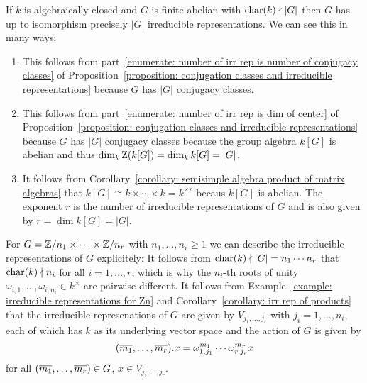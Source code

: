 \begin{example}
  \label{example: irrep of finite abelian groups}
  If $k$ is algebraically closed and $G$ is finite abelian with $\operatorname{char}(k) \nmid |G|$ then $G$ has up to isomorphism precisely $|G|$ irreducible representations.
  We can see this in many ways:
  \begin{enumerate}
    \item
      This follows from part~\ref*{enumerate: number of irr rep is number of conjugacy classes} of Proposition~\ref*{proposition: conjugation classes and irreducible representations} because $G$ has $|G|$ conjugacy classes.
    \item
      This follows from part~\ref*{enumerate: number of irr rep is dim of center} of Proposition~\ref*{proposition: conjugation classes and irreducible representations} because $G$ has $|G|$ conjugacy classes because the group algebra $k[G]$ is abelian and thus $\dim_k \operatorname{Z}(k[G]) = \dim_k k[G] = |G|$.
    \item
      It follows from Corollary~\ref{corollary: semisimple algebra product of matrix algebras} that $k[G] \cong k \times \dotsb \times k = k^{\times r}$ becaus $k[G]$ is abelian.
      The exponent $r$ is the number of irreducible representations of $G$ and is also given by $r = \dim k[G] = |G|$.
  \end{enumerate}
  For $G = \mathbb{Z}/n_1 \times \dotsb \times \mathbb{Z}/n_r$ with $n_1, \dotsc, n_r \geq 1$ we can describe the irreducible representations of $G$ explicitely:
  It follows from $\operatorname{char}(k) \nmid |G| = n_1 \dotsm n_r$ that $\operatorname{char}(k) \nmid n_i$ for all $i = 1, \dotsc, r$, which is why the $n_i$-th roots of unity $\omega_{i,1}, \dotsc, \omega_{i,n_i} \in k^\times$ are pairwise different.
  It follows from Example~\ref{example: irreducible representations for Zn} and Corollary~\ref{corollary: irr rep of products} that the irreducible represenations of $G$ are given by $V_{j_1, \dotsc, j_r}$ with $j_i = 1, \dotsc, n_i$, each of which has $k$ as its underlying vector space and the action of $G$ is given by
  \[
      (\overline{m_1}, \dotsc, \overline{m_r}) . x
    = \omega_{1,j_1}^{m_1} \dotsm \omega_{r,j_r}^{m_r} x
  \]
  for all $(\overline{m_1}, \dotsc, \overline{m_r}) \in G$, $x \in V_{j_1, \dotsc, j_r}$.
\end{example}


